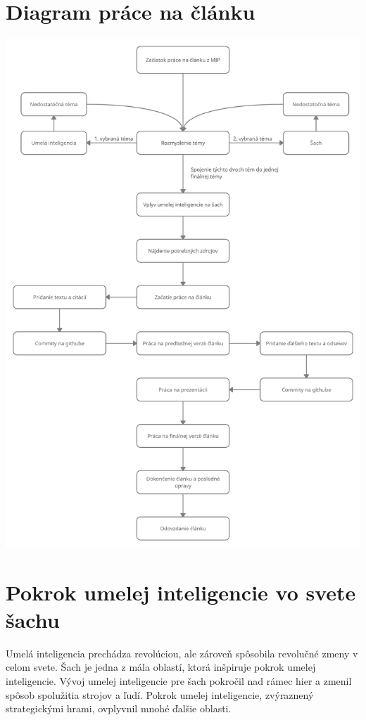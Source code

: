 \documentclass[10pt,oneside,slovak,a4paper]{article}
\begin{document}
\section{Diagram práce na článku}
\includegraphics[scale=0.21]{diagram.jpg}

\section{Pokrok umelej inteligencie vo svete šachu}

Umelá inteligencia prechádza revolúciou, ale zároveň spôsobila revolučné zmeny v celom svete. Šach je jedna z mála oblastí, ktorá inšpiruje pokrok umelej inteligencie. Vývoj umelej inteligencie pre šach pokročil nad rámec hier a zmenil spôsob spolužitia strojov a ľudí. Pokrok umelej inteligencie, zvýraznený strategickými hrami, ovplyvnil mnohé ďalšie oblasti.
\end{document}

